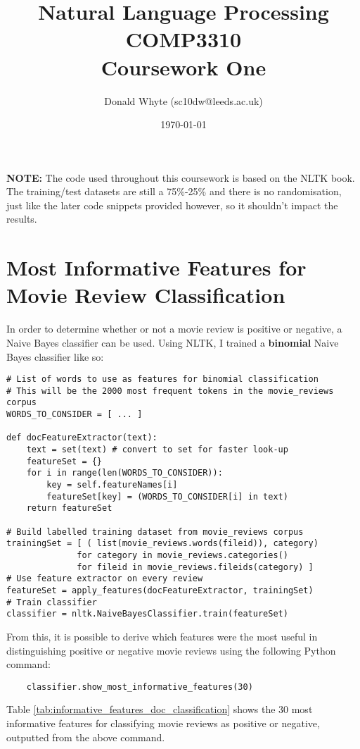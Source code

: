 \documentclass{article}
\title{Natural Language Processing \\ COMP3310 \\ Coursework One}
\author{Donald Whyte (sc10dw@leeds.ac.uk)}
\date{\today}
\begin{document}
\lstset{language=Python}
\lstset{basicstyle=\ttfamily}

\maketitle

\textbf{NOTE:} The code used throughout this coursework is based on the NLTK book. The training/test datasets are still a 75\%-25\% and there is no randomisation, just like the later code snippets provided however, so it shouldn't impact the results.

\section{Most Informative Features for Movie Review Classification}

In order to determine whether or not a movie review is positive or negative, a Naive Bayes classifier can be used. Using NLTK, I trained a \textbf{binomial} Naive Bayes classifier like so:

\begin{lstlisting}
# List of words to use as features for binomial classification
# This will be the 2000 most frequent tokens in the movie_reviews corpus
WORDS_TO_CONSIDER = [ ... ]

def docFeatureExtractor(text):
	text = set(text) # convert to set for faster look-up
	featureSet = {}
	for i in range(len(WORDS_TO_CONSIDER)):
		key = self.featureNames[i]
		featureSet[key] = (WORDS_TO_CONSIDER[i] in text)
	return featureSet

# Build labelled training dataset from movie_reviews corpus
trainingSet = [ ( list(movie_reviews.words(fileid)), category)
			  for category in movie_reviews.categories()
			  for fileid in movie_reviews.fileids(category) ] 
# Use feature extractor on every review
featureSet = apply_features(docFeatureExtractor, trainingSet)
# Train classifier 
classifier = nltk.NaiveBayesClassifier.train(featureSet)
\end{lstlisting}

From this, it is possible to derive which features were the most useful in distinguishing positive or negative movie reviews using the following Python command:

\begin{lstlisting}
	classifier.show_most_informative_features(30)
\end{lstlisting}
Table \ref{tab:informative_features_doc_classification} shows the 30 most informative features for classifying movie reviews as positive or negative, outputted from the above command.
\end{document}
